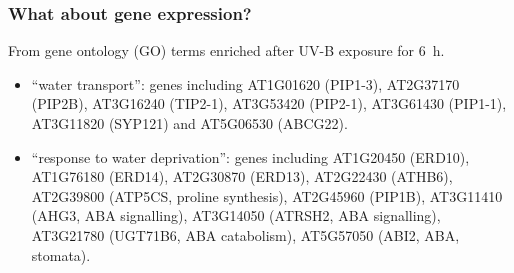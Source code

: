 \documentclass[10pt]{beamer}\usepackage[]{graphicx}\usepackage[]{color}
\begin{document}
\begin{frame}
  \frametitle{What about gene expression?}
  From gene ontology (GO) terms enriched after UV-B exposure for 6~h.
  \begin{itemize}
    \item ``water transport'': genes including AT1G01620 (PIP1-3), AT2G37170 (PIP2B), AT3G16240 (TIP2-1), AT3G53420 (PIP2-1), AT3G61430 (PIP1-1), AT3G11820 (SYP121) and AT5G06530 (ABCG22).
    \item ``response to water deprivation'': genes including AT1G20450 (ERD10), AT1G76180 (ERD14), AT2G30870 (ERD13), AT2G22430 (ATHB6), AT2G39800 (ATP5CS, proline synthesis), AT2G45960 (PIP1B), AT3G11410 (AHG3, ABA signalling), AT3G14050 (ATRSH2, ABA signalling), AT3G21780 (UGT71B6, ABA catabolism), AT5G57050 (ABI2, ABA, stomata).
  \end{itemize}
\end{frame}
%
%
%
\end{document}
